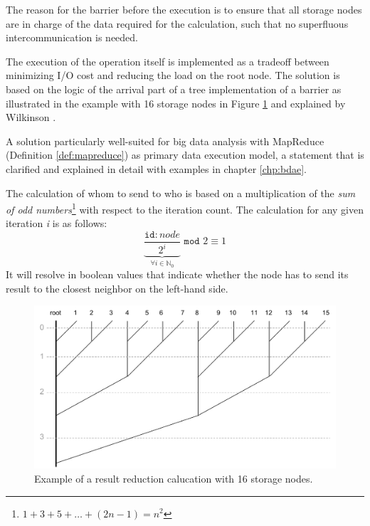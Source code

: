 \newpage
\noindent
The reason for the barrier before the execution is to ensure that all storage nodes are in charge of the data required for the calculation, such that no superfluous intercommunication is needed.
\newline

The execution of the operation itself is implemented as a tradeoff between minimizing I/O cost and reducing the load on the root node. The solution is based on the logic of the arrival part of a tree implementation of a barrier as illustrated in the example with 16 storage nodes in Figure \ref{fig:reduction-tree} and explained by Wilkinson \etal \cite{Wilkinson:1998:PPT:289352}.

A solution particularly well-suited for big data analysis with MapReduce (Definition \ref{def:mapreduce}) as primary data execution model, a statement that is clarified and explained in detail with examples in chapter \ref{chp:bdae}.
\newline

The calculation of whom to send to who is based on a multiplication of the \textit{sum of odd numbers}\footnote{$1 + 3 + 5 + \ldots + (2n-1) = n^2$} with respect to the iteration count. The calculation for any given iteration \textit{i} is as follows:
\begin{equation} \label{eq:reduction}
\underbrace{\dfrac{\texttt{id}:node}{2^{i}}}_{\forall i \in \mathbb{N}_0} \texttt{ mod } 2 \equiv 1
\end{equation}
It will resolve in boolean values that indicate whether the node has to send its result to the closest neighbor on the left-hand side.
\newline

\begin{figure}
	\centering
	\includegraphics[scale=0.5]{pdf/reduction-tree.pdf}
	\caption[Result reduction calucation example]{Example of a result reduction calucation with 16 storage nodes. \label{fig:reduction-tree}}
\end{figure}	

